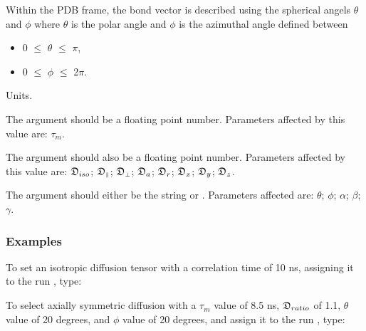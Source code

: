 Within the PDB  frame, the bond vector is described using the spherical angels $\theta$ and $\phi$
where $\theta$ is the polar angle  and $\phi$ is the azimuthal angle  defined between

\begin{itemize}
\item[]     0 $\le$ $\theta$ $\le$ $\pi$,
\item[]     0 $\le$ $\phi$ $\le$ 2$\pi$.
\end{itemize}


Units.

The 
 argument should be a floating point  number.  Parameters affected by this
value are:  $\tau_m$.

The 
 argument should also be a floating point  number.  Parameters affected by this
value are:  $\mathfrak{D}_{iso}$; $\mathfrak{D}_{\scriptscriptstyle \parallel}$; $\mathfrak{D}_{\scriptscriptstyle \perp}$; $\mathfrak{D}_a$; $\mathfrak{D}_r$; $\mathfrak{D}_x$; $\mathfrak{D}_y$; $\mathfrak{D}_z$.

The 
 argument should either be the string 
 or 
.  Parameters affected
are:  $\theta$; $\phi$; $\alpha$; $\beta$; $\gamma$.



\subsubsection{Examples}

To set an isotropic  diffusion tensor  with a correlation time  of 10 ns, assigning it to the
run 
, type:







To select axially symmetric  diffusion with a $\tau_m$ value of 8.5 ns, $\mathfrak{D}_{ratio}$ of 1.1, $\theta$ value
of 20 degrees, and $\phi$ value of 20 degrees, and assign it to the run 
, type:

